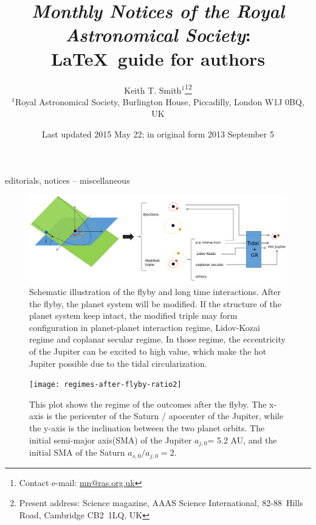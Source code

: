 \documentclass[fleqn,usenatbib,useAMS]{mnras}
\title[MNRAS \LaTeX\ guide for authors]{\textit{Monthly Notices of the Royal Astronomical
  Society}: \\ \LaTeX\ guide for authors}
\author[K. T. Smith]{Keith T. Smith$^{1}$\thanks{Contact e-mail: \href{mailto:mn@ras.org.uk}{mn@ras.org.uk}}\thanks{Present address: Science magazine, AAAS Science International, \mbox{82-88}~Hills Road, Cambridge CB2~1LQ, UK}
\\
$^{1}$Royal Astronomical Society, Burlington House, Piccadilly, London W1J 0BQ, UK}
\date{Last updated 2015 May 22; in original form 2013 September 5}
\begin{document}
\label{firstpage}
\pagerange{\pageref{firstpage}--\pageref{lastpage}}
\maketitle

\begin{abstract}

\end{abstract}

\begin{keywords}
editorials, notices -- miscellaneous
\end{keywords}



\begin{figure}
	\includegraphics[width=\textwidth]{schematics}
	\caption{Schematic illustration of the flyby and long time interactions. After the flyby, the planet system will be modified. If the structure of the planet system keep intact, the modified triple may form configuration in planet-planet interaction regime, Lidov-Kozai regime and coplanar secular regime. In those regime, the eccentricity of the Jupiter can be excited to high value, which make the hot Jupiter possible due to the tidal circularization.}
	\label{fig:schematics}
\end{figure}


\begin{figure}
	\texttt{[image: regimes-after-flyby-ratio2]}
	\caption{This plot shows the regime of the outcomes after the flyby. The x-axis is the pericenter of the Saturn / apocenter of the Jupiter, while the y-axis is the inclination between the two planet orbits. The initial semi-major axis(SMA) of the Jupiter $a_{j,0}$= 5.2 AU, and the initial SMA of the Saturn $a_{s,0}/a_{j,0}=2$. }
	\label{fig:schematics}
\end{figure}
\end{document}
